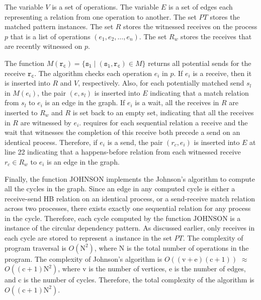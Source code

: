 The variable $\mathit{V}$ is a set of operations. The variable $\mathit{E}$ is a set of edges each representing a relation from one operation to another. 
The set $\mathit{PT}$ stores the matched pattern instances.
The set $\mathit{R}$ stores the witnessed receives on the process $p$ that is a list of operations $(e_1, e_2, \dots, e_n)$. 
The set $\mathit{R_w}$ stores the receives that are recently witnessed on $p$.

The function $\mathit{M}(\mathtt{r_c}) = \{\mathtt{s_l}\mid(\mathtt{s_l},\mathtt{r_c})\in\mathit{M}\}$ returns all potential sends for the receive $\mathtt{r_c}$. The algorithm checks each operation $e_i$ in $p$. 
If $\mathit{e_i}$ is a receive, then it is inserted into $\mathit{R}$ and $\mathit{V}$, respectively. Also, for each potentially matched send $\mathit{s_l}$ in $\mathit{M}(\mathit{e_i})$, the pair $(\mathit{e},\mathit{s_l})$ is inserted into $\mathit{E}$ indicating that a match relation from $\mathit{s_l}$ to $\mathit{e_i}$ is an edge in the graph. If $\mathit{e_i}$ is a wait, all the receives in $\mathit{R}$ are inserted to $\mathit{R_w}$ and $\mathit{R}$ is set back to an empty set, indicating that all the receives in $\mathit{R}$ are witnessed by $\mathit{e_i}$.  requires for each sequential relation a receive and the wait that witnesses the completion of this receive both precede a send on an identical process. Therefore, %
if $\mathit{e_i}$ is a send, the pair $(\mathit{r_c},\mathit{e_i})$ is inserted into $\mathit{E}$ at line 22 indicating that a happens-before relation from each witnessed receive $\mathit{r_c}\in\mathit{R_w}$ to $\mathit{e_i}$ is an edge in the graph. 

Finally, the function $\mathrm{JOHNSON}$ implements the Johnson's algorithm to compute all the cycles in the graph. Since an edge in any computed cycle is either a receive-send HB relation on an identical process, or a send-receive match relation across two processes, there exists exactly one sequential relation for any process in the cycle. Therefore, each cycle computed by the function $\mathrm{JOHNSON}$ is a instance of the circular dependency pattern. As discussed earlier, only receives in each cycle are stored to represent a instance in the set $\mathit{PT}$. The complexity of program traversal is $O(\mathrm{N}^2)$, where $\mathrm{N}$ is the total number of operations in the program. The complexity of Johnson's algorithm is $O((\mathrm{v}+\mathrm{e})(\mathrm{c}+1))$ $\approx$ $O((\mathrm{c}+1)\mathrm{N}^2)$, where $\mathrm{v}$ is the number of vertices, $\mathrm{e}$ is the number of edges, and $\mathrm{c}$ is the number of cycles. Therefore, the total complexity of the algorithm is $O((\mathrm{c}+1)\mathrm{N}^2)$.

